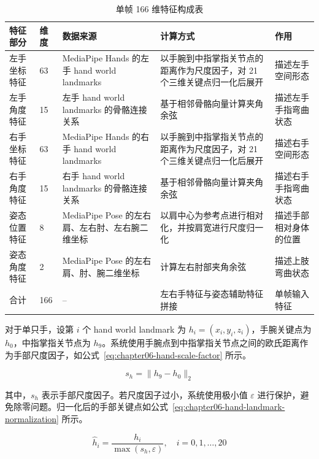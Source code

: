 \begin{longtable}{L{0.15\textwidth} L{0.08\textwidth} L{0.25\textwidth} L{0.27\textwidth} L{0.15\textwidth}}
  \caption{单帧 166 维特征构成表}
  \label{tab:chapter06-realtime-feature-composition}\\
  \toprule
  特征部分 & 维度 & 数据来源 & 计算方式 & 作用 \\
  \midrule
  左手坐标特征 & 63 & MediaPipe Hands 的左手 hand world landmarks & 以手腕到中指掌指关节点的距离作为尺度因子，对 21 个三维关键点归一化后展开 & 描述左手空间形态 \\
  左手角度特征 & 15 & 左手 hand world landmarks 的骨骼连接关系 & 基于相邻骨骼向量计算夹角余弦 & 描述左手手指弯曲状态 \\
  右手坐标特征 & 63 & MediaPipe Hands 的右手 hand world landmarks & 以手腕到中指掌指关节点的距离作为尺度因子，对 21 个三维关键点归一化后展开 & 描述右手空间形态 \\
  右手角度特征 & 15 & 右手 hand world landmarks 的骨骼连接关系 & 基于相邻骨骼向量计算夹角余弦 & 描述右手手指弯曲状态 \\
  姿态位置特征 & 8 & MediaPipe Pose 的左右肩、左右肘、左右腕二维坐标 & 以肩中心为参考点进行相对化，并按肩宽进行尺度归一化 & 描述手部相对身体的位置 \\
  姿态角度特征 & 2 & MediaPipe Pose 的左右肩、肘、腕二维坐标 & 计算左右肘部夹角余弦 & 描述上肢弯曲状态 \\
  合计 & 166 & -- & 左右手特征与姿态辅助特征拼接 & 单帧输入特征 \\
  \bottomrule
\end{longtable}

对于单只手，设第 $i$ 个 hand world landmark 为 $h_i=(x_i,y_i,z_i)$，手腕关键点为 $h_0$，中指掌指关节点为 $h_9$。系统使用手腕点到中指掌指关节点之间的欧氏距离作为手部尺度因子，如公式~\ref{eq:chapter06-hand-scale-factor} 所示。

\begin{equation}
s_h = \lVert h_9 - h_0 \rVert_2
\label{eq:chapter06-hand-scale-factor}
\end{equation}

其中，$s_h$ 表示手部尺度因子。若尺度因子过小，系统使用极小值 $\varepsilon$ 进行保护，避免除零问题。归一化后的手部关键点如公式~\ref{eq:chapter06-hand-landmark-normalization} 所示。

\begin{equation}
\hat{h}_i = \frac{h_i}{\max(s_h,\varepsilon)},\quad i=0,1,\ldots,20
\label{eq:chapter06-hand-landmark-normalization}
\end{equation}

